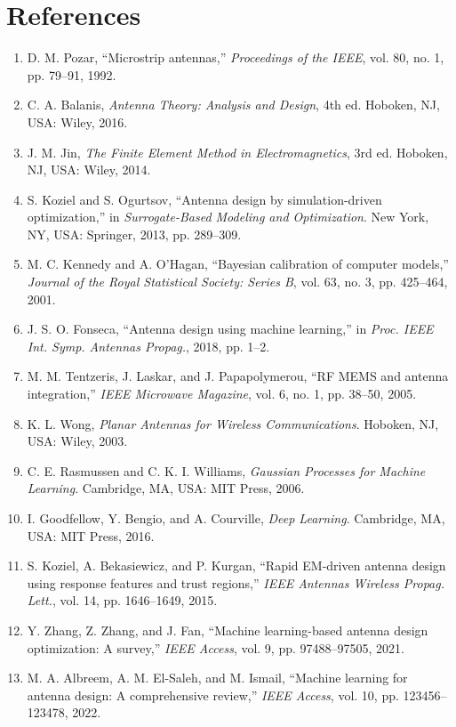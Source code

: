 \documentclass[conference]{IEEEtran}
\begin{document}
\section*{References}
\begin{enumerate}
    \item D. M. Pozar, ``Microstrip antennas,'' \emph{Proceedings of the IEEE}, vol. 80, no. 1, pp. 79--91, 1992.
    \item C. A. Balanis, \emph{Antenna Theory: Analysis and Design}, 4th ed. Hoboken, NJ, USA: Wiley, 2016.
    \item J. M. Jin, \emph{The Finite Element Method in Electromagnetics}, 3rd ed. Hoboken, NJ, USA: Wiley, 2014.
    \item S. Koziel and S. Ogurtsov, ``Antenna design by simulation-driven optimization,'' in \emph{Surrogate-Based Modeling and Optimization}. New York, NY, USA: Springer, 2013, pp. 289--309.
    \item M. C. Kennedy and A. O'Hagan, ``Bayesian calibration of computer models,'' \emph{Journal of the Royal Statistical Society: Series B}, vol. 63, no. 3, pp. 425--464, 2001.
    \item J. S. O. Fonseca, ``Antenna design using machine learning,'' in \emph{Proc. IEEE Int. Symp. Antennas Propag.}, 2018, pp. 1--2.
    \item M. M. Tentzeris, J. Laskar, and J. Papapolymerou, ``RF MEMS and antenna integration,'' \emph{IEEE Microwave Magazine}, vol. 6, no. 1, pp. 38--50, 2005.
    \item K. L. Wong, \emph{Planar Antennas for Wireless Communications}. Hoboken, NJ, USA: Wiley, 2003.
    \item C. E. Rasmussen and C. K. I. Williams, \emph{Gaussian Processes for Machine Learning}. Cambridge, MA, USA: MIT Press, 2006.
    \item I. Goodfellow, Y. Bengio, and A. Courville, \emph{Deep Learning}. Cambridge, MA, USA: MIT Press, 2016.
    \item S. Koziel, A. Bekasiewicz, and P. Kurgan, ``Rapid EM-driven antenna design using response features and trust regions,'' \emph{IEEE Antennas Wireless Propag. Lett.}, vol. 14, pp. 1646--1649, 2015.
    \item Y. Zhang, Z. Zhang, and J. Fan, ``Machine learning-based antenna design optimization: A survey,'' \emph{IEEE Access}, vol. 9, pp. 97488--97505, 2021.
    \item M. A. Albreem, A. M. El-Saleh, and M. Ismail, ``Machine learning for antenna design: A comprehensive review,'' \emph{IEEE Access}, vol. 10, pp. 123456--123478, 2022.

\end{enumerate}
\end{document}
